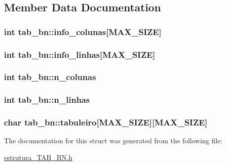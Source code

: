 \subsection{Member Data Documentation}
\hypertarget{structtab__bn_a5db4acd87d1a3dfc8b334e3d8564107b}{
\subsubsection[{info\-\_\-colunas}]{\setlength{\rightskip}{0pt plus 5cm}int tab\-\_\-bn\-::info\-\_\-colunas\mbox{[}{\bf M\-A\-X\-\_\-\-S\-I\-Z\-E}\mbox{]}}}\label{structtab__bn_a5db4acd87d1a3dfc8b334e3d8564107b}
\hypertarget{structtab__bn_a0f37b7b7a722455c0d5fdb3a0b21eb18}{
\subsubsection[{info\-\_\-linhas}]{\setlength{\rightskip}{0pt plus 5cm}int tab\-\_\-bn\-::info\-\_\-linhas\mbox{[}{\bf M\-A\-X\-\_\-\-S\-I\-Z\-E}\mbox{]}}}\label{structtab__bn_a0f37b7b7a722455c0d5fdb3a0b21eb18}
\hypertarget{structtab__bn_a42bb71ad662aa571a66445b1d81d481e}{
\subsubsection[{n\-\_\-colunas}]{\setlength{\rightskip}{0pt plus 5cm}int tab\-\_\-bn\-::n\-\_\-colunas}}\label{structtab__bn_a42bb71ad662aa571a66445b1d81d481e}
\hypertarget{structtab__bn_a986e57359e4e4630edd0994d615b3eaa}{
\subsubsection[{n\-\_\-linhas}]{\setlength{\rightskip}{0pt plus 5cm}int tab\-\_\-bn\-::n\-\_\-linhas}}\label{structtab__bn_a986e57359e4e4630edd0994d615b3eaa}
\hypertarget{structtab__bn_a35d0fd28d6f47a6705a24fbcbdde4d63}{
\subsubsection[{tabuleiro}]{\setlength{\rightskip}{0pt plus 5cm}char tab\-\_\-bn\-::tabuleiro\mbox{[}{\bf M\-A\-X\-\_\-\-S\-I\-Z\-E}\mbox{]}\mbox{[}{\bf M\-A\-X\-\_\-\-S\-I\-Z\-E}\mbox{]}}}\label{structtab__bn_a35d0fd28d6f47a6705a24fbcbdde4d63}


The documentation for this struct was generated from the following file\-:\begin{DoxyCompactItemize}
\item 
\hyperlink{estrutura__TAB__BN_8h}{estrutura\-\_\-\-T\-A\-B\-\_\-\-B\-N.\-h}\end{DoxyCompactItemize}
